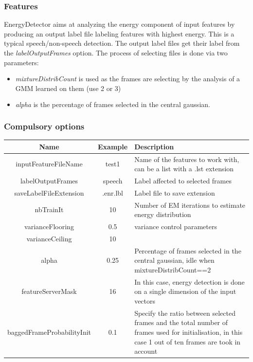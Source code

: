 \documentclass[a4paper]{article}
\begin{document}
\subsubsection{Features}
EnergyDetector aims at analyzing the energy component of input
features by producing an output label file labeling features with
highest energy. This is a typical speech/non-speech detection. The
output label files get their label from the
\textit{labelOutputFrames} option. The process of selecting files is
done via two parameters:
\begin{itemize}
\item \textit{mixtureDistribCount} is used as the frames are selecting by the analysis of a GMM learned on them (use 2 or 3)
\item \textit{alpha} is the percentage of frames selected in the central gaussian.
\end{itemize}

\subsubsection{Compulsory options}

\begin{tabular}{|c|c||p{8cm}|}
\hline Name & Example & Description\\
\hline
\hline inputFeatureFileName & test1 & Name of the features to work with, can be a list with a .lst extension\\
\hline labelOutputFrames &  speech & Label affected to selected frames\\
\hline saveLabelFileExtension & .enr.lbl & Label file to save extension\\
\hline nbTrainIt & 10 & Number of EM iterations to estimate energy distribution\\
\hline varianceFlooring & 0.5 & variance control parameters\\
\cline{1-2} varianceCeiling & 10 & \\
\hline alpha & 0.25 & Percentage of frames selected in the central gaussian, idle when mixtureDistribCount==2\\
\hline featureServerMask & 16 & In this case, energy detection is done on a single dimension of the input vectors\\
\hline baggedFrameProbabilityInit & 0.1 & Specify the ratio between selected frames and the total number of frames used for initialisation, in this case 1 out of ten frames are took in account\\
\hline
\end{tabular}
\end{document}
